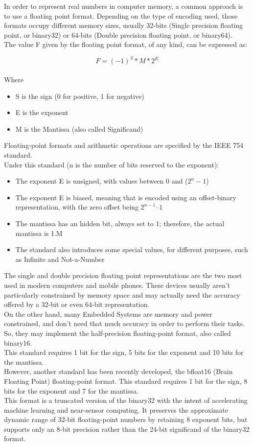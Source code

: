 In order to represent real numbers in computer memory, a common approach is to use a floating point format. Depending on the type of encoding used, those formats occupy different memory sizes, usually 32-bits (Single precision floating point, or binary32) or 64-bits (Double precision floating point, or binary64). \\
The value F given by the floating point format, of any kind, can be expressed as:

$$F = (-1)^{S}*M*2^{E} $$
\\

Where 
\begin{itemize}
	\item S is the sign (0 for positive, 1 for negative)
	\item E is the exponent
	\item M is the Mantissa (also called Significand)
\end{itemize}

Floating-point formats and arithmetic operations are specified by the IEEE 754 standard. \\
Under this standard (n is the number of bits reserved to the exponent):
\begin{itemize}
	\item The exponent E is unsigned, with values between 0 and ($2^{n} -1$)
	\item	The exponent E is biased, meaning that is encoded using an offset-binary representation, with the zero offset being 			$2^{n-1} – 1$
	\item	The mantissa has an hidden bit, always set to 1; therefore, the actual mantissa is 1.M
	\item	The standard also introduces some special values, for different purposes, such as Infinite and Not-a-Number
\end{itemize}

The single and double precision floating point representations are the two most used in modern computers and mobile phones. These devices usually aren’t particularly constrained by memory space and may actually need the accuracy offered by a 32-bit or even 64-bit representation.\\
On the other hand, many Embedded Systems are memory and power constrained, and don’t need that much accuracy in order to perform their tasks. So, they may implement the half-precision floating-point format, also called binary16. \\
This standard requires 1 bit for the sign, 5 bits for the exponent and 10 bits for the mantissa. \\
However, another standard has been recently developed, the bfloat16 (Brain Floating Point) floating-point format. This standard requires 1 bit for the sign, 8 bits for the exponent and 7 for the mantissa. \\
This format is a truncated version of the binary32 with the intent of accelerating machine learning and near-sensor computing. It preserves the approximate dynamic range of 32-bit floating-point numbers by retaining 8 exponent bits, but supports only an 8-bit precision rather than the 24-bit significand of the binary32 format. 

